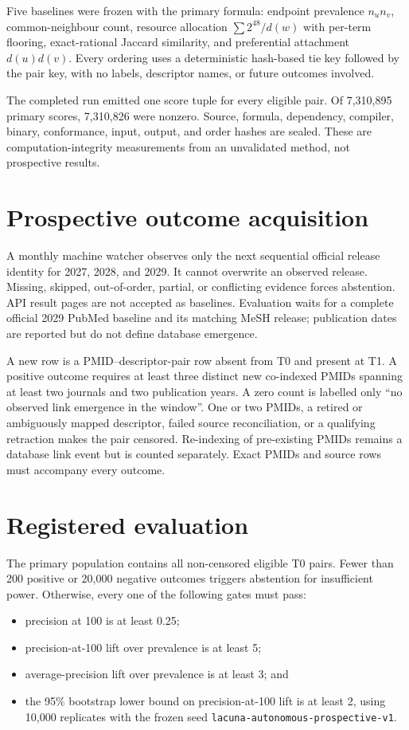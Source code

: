 \documentclass[11pt]{article}
\begin{document}
Five baselines were frozen with the primary formula: endpoint prevalence $n_un_v$, common-neighbour
count, resource allocation $\sum 2^{48}/d(w)$ with per-term flooring, exact-rational Jaccard
similarity, and preferential attachment $d(u)d(v)$. Every ordering uses a deterministic hash-based
tie key followed by the pair key, with no labels, descriptor names, or future outcomes involved.

The completed run emitted one score tuple for every eligible pair. Of 7,310,895 primary scores,
7,310,826 were nonzero. Source, formula, dependency, compiler, binary, conformance, input, output,
and order hashes are sealed. These are computation-integrity measurements from an unvalidated
method, not prospective results.

\section{Prospective outcome acquisition}

A monthly machine watcher observes only the next sequential official release identity for 2027,
2028, and 2029. It cannot overwrite an observed release. Missing, skipped, out-of-order, partial, or
conflicting evidence forces abstention. API result pages are not accepted as baselines. Evaluation
waits for a complete official 2029 PubMed baseline and its matching MeSH release; publication dates
are reported but do not define database emergence.

A new row is a PMID--descriptor-pair row absent from T0 and present at T1. A positive outcome
requires at least three distinct new co-indexed PMIDs spanning at least two journals and two
publication years. A zero count is labelled only ``no observed link emergence in the window''.
One or two PMIDs, a retired or ambiguously mapped descriptor, failed source reconciliation, or a
qualifying retraction makes the pair censored. Re-indexing of pre-existing PMIDs remains a database
link event but is counted separately. Exact PMIDs and source rows must accompany every outcome.

\section{Registered evaluation}

The primary population contains all non-censored eligible T0 pairs. Fewer than 200 positive or
20,000 negative outcomes triggers abstention for insufficient power. Otherwise, every one of the
following gates must pass:
\begin{itemize}
  \item precision at 100 is at least 0.25;
  \item precision-at-100 lift over prevalence is at least 5;
  \item average-precision lift over prevalence is at least 3; and
  \item the 95\% bootstrap lower bound on precision-at-100 lift is at least 2, using 10,000
        replicates with the frozen seed \texttt{lacuna-autonomous-prospective-v1}.
\end{itemize}
\end{document}

